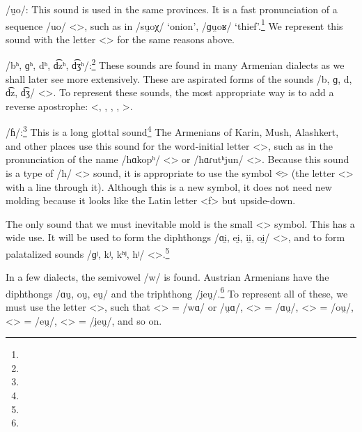 /u̯o/: This sound is used in the same provinces. It is a fast pronunciation of a sequence /uo/ <>, such as in /su̯oχ/  `onion', /ɡu̯oʁ/  `thief'.\footnote{} We represent this sound with the letter <> for the same reasons above. 

/bʰ, ɡʰ, dʰ, d͡zʰ, d͡ʒʰ/:\footnote{} These sounds are found in many Armenian dialects as we shall later see more extensively. These are aspirated forms of the sounds /b, ɡ, d, d͡z, d͡ʒ/ <>. To represent these sounds, the most appropriate way is to add a reverse apostrophe: <, , , , >. 

/ɦ/:\footnote{} This is a long glottal sound\footnote{} The Armenians of Karin, Mush, Alashkert, and other places use this sound for the word-initial letter <>, such as in the pronunciation of the name /hɑkopʰ/ <> or /hɑɾutʰjun/ <>. Because this sound is a type of /h/ <> sound, it is appropriate to use the symbol <̵> (the letter <> with a line through it). Although this is a new symbol, it does not need new molding because it looks like the Latin letter <f> but upside-down.

The only sound that we must inevitable mold is the small <> symbol. This has a wide use. It will be used to form the diphthongs /ɑi̯, ei̯, ii̯, oi̯/ <>, and to form palatalized sounds /ɡʲ, kʲ, kʰʲ, hʲ/ <>.\footnote{}

In a few dialects, the semivowel /w/ is found. Austrian Armenians have the diphthongs /ɑu̯, ou̯, eu̯/ and the triphthong /i̯eu̯/.\footnote{} To represent all of these, we must use the letter <>, such that <> = /wɑ/ or /u̯ɑ/, <> = /ɑu̯/, <> = /ou̯/, <> = /eu̯/, <> = /i̯eu̯/, and so on. 

